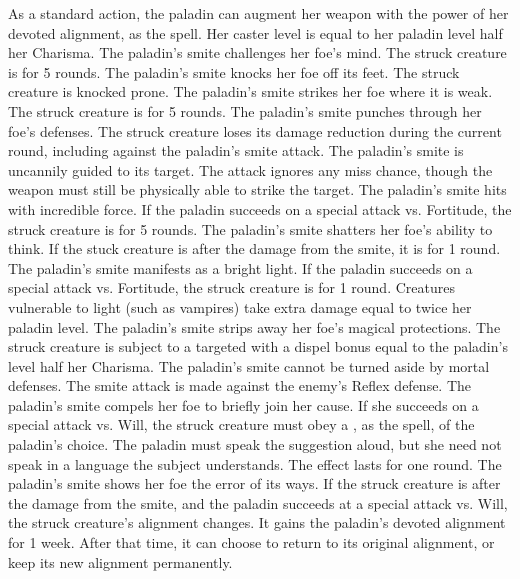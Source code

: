  As a standard action, the paladin can augment her weapon with the power of her devoted alignment, as the  spell. Her caster level is equal to her paladin level \add half her Charisma.
 The paladin's smite challenges her foe's mind. The struck creature is \bewildered for 5 rounds.
 The paladin's smite knocks her foe off its feet. The struck creature is knocked prone.
 The paladin's smite strikes her foe where it is weak. The struck creature is \sickened for 5 rounds.
 The paladin's smite punches through her foe's defenses. The struck creature loses its damage reduction during the current round, including against the paladin's smite attack.
 The paladin's smite is uncannily guided to its target. The attack ignores any miss chance, though the weapon must still be physically able to strike the target.
 The paladin's smite hits with incredible force. If the paladin succeeds on a special attack vs. Fortitude, the struck creature is \staggered for 5 rounds.
 The paladin's smite shatters her foe's ability to think. If the stuck creature is \bloodied after the damage from the smite, it is \dazed for 1 round.
 The paladin's smite manifests as a bright light. If the paladin succeeds on a special attack vs. Fortitude, the struck creature is \blinded for 1 round. Creatures vulnerable to light (such as vampires) take extra damage equal to twice her paladin level.
 The paladin's smite strips away her foe's magical protections. The struck creature is subject to a targeted  with a dispel bonus equal to the paladin's level \add half her Charisma.
 The paladin's smite cannot be turned aside by mortal defenses. The smite attack is made against the enemy's Reflex defense.
 The paladin's smite compels her foe to briefly join her cause. If she succeeds on a special attack vs. Will, the struck creature must obey a , as the spell, of the paladin's choice. The paladin must speak the suggestion aloud, but she need not speak in a language the subject understands. The effect lasts for one round.
 The paladin's smite shows her foe the error of its ways. If the struck creature is \bloodied after the damage from the smite, and the paladin succeeds at a special attack vs. Will, the struck creature's alignment changes. It gains the paladin's devoted alignment for 1 week. After that time, it can choose to return to its original alignment, or keep its new alignment permanently.

